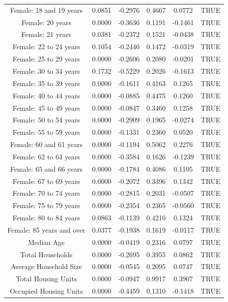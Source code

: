 \documentclass{article} %
\begin{document}
\begin{table}[H]
\begin{adjustbox}{width = 0.8\textwidth}
\begin{tabular}{cccccc}
  Female: 18 and 19 years & 0.0851 & -0.2976 & 0.4667 & 0.0772 & TRUE \\ 
  Female: 20 years & 0.0000 & -0.3636 & 0.1191 & -0.1461 & TRUE \\ 
  Female: 21 years & 0.0381 & -0.2372 & 0.1521 & -0.0438 & TRUE \\ 
  Female: 22 to 24 years & 0.1054 & -0.2446 & 0.1472 & -0.0319 & TRUE \\ 
  Female: 25 to 29 years & 0.0000 & -0.2606 & 0.2080 & -0.0201 & TRUE \\ 
  Female: 30 to 34 years & 0.1732 & -0.5229 & 0.2026 & -0.1613 & TRUE \\ 
  Female: 35 to 39 years & 0.0000 & -0.1611 & 0.4163 & 0.1265 & TRUE \\ 
  Female: 40 to 44 years & 0.0000 & -0.0885 & 0.4475 & 0.1260 & TRUE \\ 
  Female: 45 to 49 years & 0.0000 & -0.0847 & 0.3460 & 0.1258 & TRUE \\ 
  Female: 50 to 54 years & 0.0000 & -0.2909 & 0.1965 & -0.0274 & TRUE \\ 
  Female: 55 to 59 years & 0.0000 & -0.1331 & 0.2360 & 0.0520 & TRUE \\ 
  Female: 60 and 61 years & 0.0000 & -0.1194 & 0.5062 & 0.2276 & TRUE \\ 
  Female: 62 to 64 years & 0.0000 & -0.3584 & 0.1626 & -0.1239 & TRUE \\ 
  Female: 65 and 66 years & 0.0000 & -0.1784 & 0.4086 & 0.1105 & TRUE \\ 
  Female: 67 to 69 years & 0.0000 & -0.2072 & 0.3396 & 0.1342 & TRUE \\ 
  Female: 70 to 74 years & 0.0000 & -0.2815 & 0.2031 & -0.0507 & TRUE \\ 
  Female: 75 to 79 years & 0.0000 & -0.2354 & 0.2365 & -0.0560 & TRUE \\ 
  Female: 80 to 84 years & 0.0863 & -0.1139 & 0.4210 & 0.1324 & TRUE \\ 
  Female: 85 years and over & 0.0377 & -0.1938 & 0.1619 & -0.0117 & TRUE \\ 
  Median Age & 0.0000 & -0.0419 & 0.2316 & 0.0797 & TRUE \\ 
  Total Households & 0.0000 & -0.2695 & 0.3955 & 0.0862 & TRUE \\ 
  Average Household Size & 0.0000 & -0.0545 & 0.2095 & 0.0747 & TRUE \\ 
  Total Housing Units & 0.0000 & -0.0947 & 0.9917 & 0.3907 & TRUE \\ 
  Occupied Housing Units & 0.0000 & -0.4459 & 0.1310 & -0.1418 & TRUE \\ 

\end{tabular}
\end{adjustbox}
\end{table}
\end{document}
